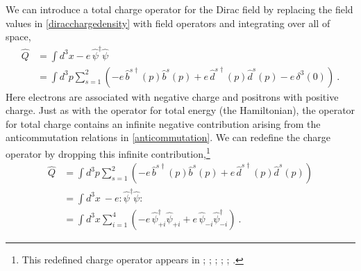 \documentclass[12pt,secnumarabic,amsmath,amssymb,balancelastpage,nofootinbib]{article}
\begin{document}
We can introduce a total charge operator for the Dirac field by replacing the field values in \eqref{diracchargedensity} with field operators and integrating over all of space,
\begin{align}
\widehat{Q}&= \int{d^3 x -e\,\widehat{\psi}^\dagger \widehat{\psi}}
\nonumber
\\
&=\int{d^3 p \sum_{s=1}^2  \left(-e\,\widehat{b}^{s\dagger}(p)\widehat{b}^s(p)+e\,\widehat{d}^{s\dagger}(p)\widehat{d}^{s}(p)-e\, \delta^3(0)\right)}
\ .
\label{badtotalcharge}
\end{align}
Here electrons are associated with negative charge and positrons with positive charge.  Just as with the operator for total energy (the Hamiltonian), the operator for total charge contains an infinite negative contribution arising from the anticommutation relations in \eqref{anticommutation}.  We can redefine the charge operator by dropping this infinite contribution,\footnote{This redefined charge operator appears in \citet[pg.\ 228]{schweberQFT}; \citet[pg.\ 60]{bjorkendrellfields}; \citet[pg.\ 71]{hatfield}; \citet[pg.\ 139]{ryder}; \citet[sec.\ 5.3]{greiner1996}; \citet[pg.\ 52]{duncan}.}
\begin{align}
\widehat{Q}&=\int{d^3 p \sum_{s=1}^2  \left(-e\,\widehat{b}^{s\dagger}(p)\widehat{b}^s(p)+e\,\widehat{d}^{s\dagger}(p)\widehat{d}^{s}(p)\right)}
\nonumber
\\
&=  \int{d^3 x \ -e :\widehat{\psi}^\dagger\widehat{\psi}:}
\nonumber
\\
&=  \int{d^3 x  \sum_{i=1}^4\left(-e\, \widehat{\psi}^{\dagger}_{+i} \widehat{\psi}_{+i}+e\, \widehat{\psi}_{-i}\widehat{\psi}^{\dagger}_{-i}\right)}
\ .
\label{totalcharge}
\end{align}
\end{document}
